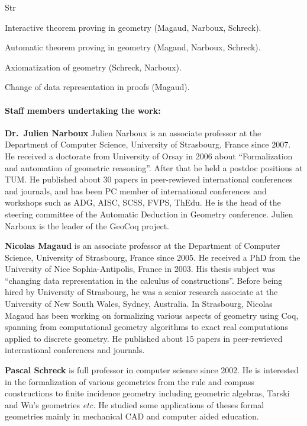 \begin{sitedescription}{Str}
\begin{compactitem}
\item {}
\item Interactive theorem proving in geometry (Magaud, Narboux, Schreck).
\item Automatic theorem proving in geometry (Magaud, Narboux, Schreck).
\item Axiomatization of geometry (Schreck, Narboux).
\item Change of data representation in proofs (Magaud). 
\end{compactitem}

\paragraph{Staff members undertaking the work:}


\textbf{Dr.\ Julien Narboux}
Julien Narboux is an associate professor at the Department of Computer Science, University of Strasbourg, France since 2007. He received a doctorate from University of Orsay in 2006 about “Formalization and automation of geometric reasoning”. After that he held a postdoc positions at TUM.
He published about 30 papers in peer-rewieved international conferences and journals, and has been PC member of international conferences and workshops such as ADG, AISC, SCSS, FVPS, ThEdu. He is the head of the steering committee of the Automatic Deduction in Geometry conference. Julien Narboux is the leader of the GeoCoq project.


\textbf{Nicolas Magaud} is an associate professor at the Department of
Computer Science, University of Strasbourg, France since 2005. He
received a PhD from the University of Nice Sophia-Antipolis, France in
2003. His thesis subject was ``changing data representation in the
calculus of constructions''. Before being hired by University of
Strasbourg, he was a senior research associate at the University of
New South Wales, Sydney, Australia. In Strasbourg, Nicolas Magaud
has been working on formalizing various aspects of geometry using Coq, spanning from
computational geometry algorithms to exact real computations applied to
discrete geometry. He published about 15 papers in peer-rewieved
international conferences and journals.  


\textbf{Pascal Schreck} is full professor in computer science since 2002. He is interested in the formalization of various geometries from the rule and compass constructions to finite incidence geometry including geometric algebras, Tarski and Wu's geometries \emph{etc.} He studied some applications of theses formal geometries mainly in mechanical CAD and computer aided education.



\end{sitedescription}
